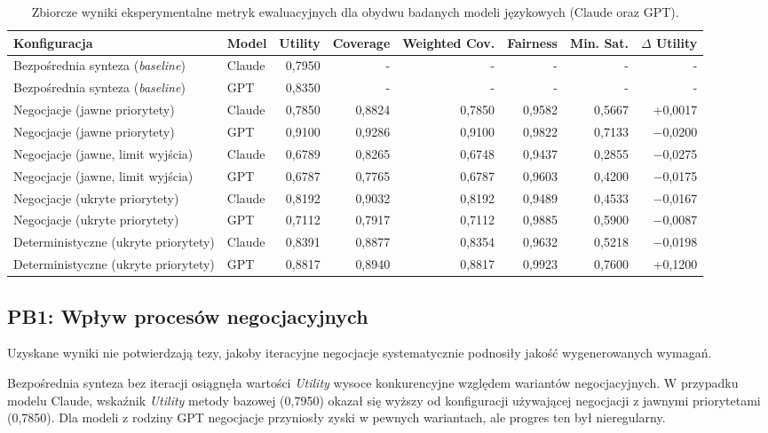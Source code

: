 \documentclass[conference]{IEEEtran}
\begin{document}
\begin{table}[t]
\centering
\small
\setlength{\tabcolsep}{5pt}
\begin{tabular}{llrrrrrr}
\toprule
Konfiguracja & Model & Utility & Coverage & Weighted Cov. & Fairness & Min. Sat. & $\Delta$ Utility \\
\midrule
Bezpośrednia synteza (\textit{baseline}) & Claude & 0,7950 & -      & -      & -      & -      & -      \\
Bezpośrednia synteza (\textit{baseline}) & GPT    & 0,8350 & -      & -      & -      & -      & -      \\
Negocjacje (jawne priorytety)            & Claude & 0,7850 & 0,8824 & 0,7850 & 0,9582 & 0,5667 & +0,0017 \\
Negocjacje (jawne priorytety)            & GPT    & 0,9100 & 0,9286 & 0,9100 & 0,9822 & 0,7133 & $-$0,0200 \\
Negocjacje (jawne, limit wyjścia)        & Claude & 0,6789 & 0,8265 & 0,6748 & 0,9437 & 0,2855 & $-$0,0275 \\
Negocjacje (jawne, limit wyjścia)        & GPT    & 0,6787 & 0,7765 & 0,6787 & 0,9603 & 0,4200 & $-$0,0175 \\
Negocjacje (ukryte priorytety)           & Claude & 0,8192 & 0,9032 & 0,8192 & 0,9489 & 0,4533 & $-$0,0167 \\
Negocjacje (ukryte priorytety)           & GPT    & 0,7112 & 0,7917 & 0,7112 & 0,9885 & 0,5900 & $-$0,0087 \\
Deterministyczne (ukryte priorytety)     & Claude & 0,8391 & 0,8877 & 0,8354 & 0,9632 & 0,5218 & $-$0,0198 \\
Deterministyczne (ukryte priorytety)     & GPT    & 0,8817 & 0,8940 & 0,8817 & 0,9923 & 0,7600 & +0,1200 \\
\bottomrule
\end{tabular}
\caption{Zbiorcze wyniki eksperymentalne metryk ewaluacyjnych dla obydwu badanych modeli językowych (Claude oraz GPT).}
\label{tab:results}
\end{table}

\subsection{PB1: Wpływ procesów negocjacyjnych}

Uzyskane wyniki nie potwierdzają tezy, jakoby iteracyjne negocjacje systematycznie podnosiły jakość wygenerowanych wymagań. 

Bezpośrednia synteza bez iteracji osiągnęła wartości \textit{Utility} wysoce konkurencyjne względem wariantów negocjacyjnych. W przypadku modelu Claude, wskaźnik \textit{Utility} metody bazowej (0,7950) okazał się wyższy od konfiguracji używającej negocjacji z jawnymi priorytetami (0,7850). Dla modeli z rodziny GPT negocjacje przyniosły zyski w pewnych wariantach, ale progres ten był nieregularny.
\end{document}
